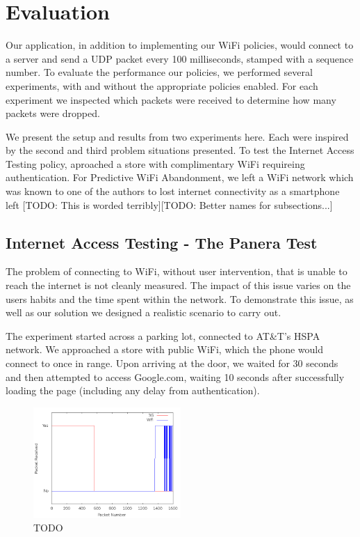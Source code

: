 \section{Evaluation}
\label{sec:eval}

Our application, in addition to implementing our WiFi policies, would connect to a server and send a UDP packet every 100 milliseconds, stamped with a sequence number. To evaluate the performance our policies, we performed several experiments, with and without the appropriate policies enabled. For each experiment we inspected which packets were received to determine how many packets were dropped.

We present the setup and results from two experiments here. Each were inspired by the second and third problem situations presented. To test the Internet Access Testing policy, aproached a store with complimentary WiFi requireing authentication. For Predictive WiFi Abandonment, we left a WiFi network which was known to one of the authors to lost internet connectivity as a smartphone left [TODO: This is worded terribly][TODO: Better names for subsections...]

\subsection{Internet Access Testing - The Panera Test}
The problem of connecting to WiFi, without user intervention, that is unable to reach the internet is not cleanly measured. The impact of this issue varies on the users habits and the time spent within the network. To demonstrate this issue, as well as our solution we designed a realistic scenario to carry out. 

The experiment started across a parking lot, connected to AT\&T's HSPA network. We approached a store with public WiFi, which the phone would connect to once in range. Upon arriving at the door, we waited for 30 seconds and then attempted to access Google.com, waiting 10 seconds after successfully loading the page (including any delay from authentication).

\begin{figure}
	\includegraphics[width=0.5\textwidth]{paneraNoPolicy}
	\caption{TODO}
\end{figure}

